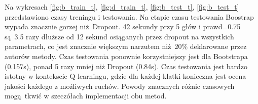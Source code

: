 \begin{figure}[H]
	\begin{floatrow}
	\end{floatrow}
\end{figure}

Na wykresach \ref{fig:b_train_t}, \ref{fig:d_train_t}, \ref{fig:b_test_t}, \ref{fig:b_test_t} przedstawiono czasy treningu i testowania. Na etapie czasu testowania Boostrap wypada znacznie gorzej niż Dropout. 42 sekundy przy 5 głów i prawd=0.75 są 3.5 razy dłuższe od 12 sekund osiąganych przez dropout na wszystkich parametrach, co jest znacznie większym narzutem niż 20\% deklarowane przez autorów metody.
Czas testowania ponownie korzystniejszy jest dla Bootstrapa (0.157s), ponad 5 razy mniej niż Dropout (0.84s). Czas testowania jest bardzo istotny w kontekscie Q-learningu, gdzie dla każdej klatki konieczna jest ocena jakości każdego z możliwych ruchów. 
Powody znacznych różnic czasowych mogą tkwić w szeczółach implementacji obu metod. 


